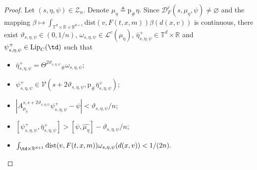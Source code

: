 \documentclass[a4paper,12pt]{article}
\newcommand{\rdp}{\mathbb{R}^{d+1}}
\newcommand{\tdr}{\mathbb{T}^{d}\times\mathbb{R}}
\begin{document}
\begin{proof}
	Let $(s,\eta,\psi)\in\mathcal{Z}_n$. Denote $\mu_{\eta}\triangleq \mathrm{p}_\#\eta$. Since $\mathcal{D}^c_F(s,\mu_\eta,\psi)\neq\varnothing$ and the mapping $\beta\mapsto\int_{\tdr\times\rdp}\mathrm{dist}(v,F(t,x,m))\beta(d(x,v))$ is continuous, there exist $\vartheta_{s,\eta,\psi}\in (0,1/n)$, $\omega_{s,\eta,\psi}\in\mathcal{L}^c(\mu_\eta)$, $\bar{\eta}^+_{s,\eta,\psi}\in\tdr$ and $\psi^+_{s,\eta,\psi}\in \mathrm{Lip}_C(\td)$ such that
	\begin{itemize}
		\item $\bar{\eta}^+_{s,\eta,\psi}=\Theta^{2\vartheta_{s,\eta,\psi}}{}_\#\omega_{s,\eta,\psi}$;
		\item $\psi^+_{s,\eta,\psi}\in\mathcal{V}(s+2\vartheta_{s,\eta,\psi},\mathrm{p}_\#\bar{\eta}^+_{s,\eta,\psi})$;
		\item $|A^{s,s+2\vartheta_{s,\eta,\psi}}_{\mu_\eta}\psi^+_{s,\eta,\psi}-\psi|< \vartheta_{s,\eta,\psi}/n$;
		\item $[\psi^+_{s,\eta,\psi},\bar{\eta}^+_{s,\eta,\psi}]> [\psi,\widehat{\mu_\eta}]-\vartheta_{s,\eta,\psi}/n$;
		\item $\int_{\td\times\rdp}\mathrm{dist}(v,F(t,x,m))\omega_{s,\eta,\psi}(d(x,v))< 1/(2n).$
	\end{itemize}
	

\end{proof}
\end{document}
